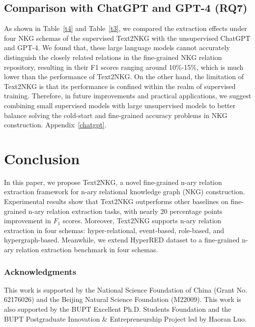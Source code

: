 \documentclass{article} \usepackage{iclr2024_conference,times}
\begin{document}
\subsection{Comparison with ChatGPT and GPT-4 (RQ7)}

As shown in Table~\ref{t4} and Table~\ref{t3}, we compared the extraction effects under four NKG schemas of the supervised Text2NKG with the unsupervised ChatGPT and GPT-4. We found that, these large language models cannot accurately distinguish the closely related relations in the fine-grained NKG relation repository, resulting in their F1 scores ranging around 10\%-15\%, which is much lower than the performance of Text2NKG. 
On the other hand, the limitation of Text2NKG is that its performance is confined within the realm of supervised training. Therefore, in future improvements and practical applications, we suggest combining small supervised models with large unsupervised models to better balance solving the cold-start and fine-grained accuracy problems in NKG construction. Appendix~\ref{chatgpt}.


\section{Conclusion}
In this paper, we propose Text2NKG, a novel fine-grained n-ary relation extraction framework for n-ary relational knowledge graph (NKG) construction. Experimental results show that Text2NKG outperforms other baselines on fine-grained n-ary relation extraction tasks, with nearly 20 percentage points improvement in $F_1$ scores. Moreover, Text2NKG supports n-ary relation extraction in four schemas: hyper-relational, event-based, role-based, and hypergraph-based. Meanwhile, we extend HyperRED dataset to a fine-grained n-ary relation extraction benchmark in four schemas.

\subsubsection*{Acknowledgments}
This work is supported by the National Science Foundation of China (Grant No. 62176026) and the Beijing Natural Science Foundation (M22009). This work is also supported by the BUPT Excellent Ph.D. Students Foundation and the BUPT Postgraduate Innovation \& Entrepreneurship Project led by Haoran Luo.
\end{document}
